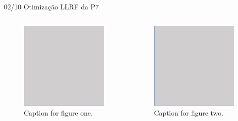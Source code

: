\documentclass{beamer}					%
\begin{document}
\begin{frame}{02/10 Otimização LLRF da P7}

\begin{columns}

\begin{column}{0.5\textwidth}
	\begin{figure}[H]
		\centering
        \includegraphics[width=.9\textwidth]{figures/figure1.png}
        \caption{Caption for figure one.}
        \label{fig:figure1}
	\end{figure}
 \end{column}

 \begin{column}{0.5\textwidth}
	\begin{figure}[H]
		\centering
        \includegraphics[width=.9\textwidth]{figures/figure1.png}
        \caption{Caption for figure two.}
        \label{fig:figure1}
	\end{figure}
 \end{column}
 

\end{columns}
\end{frame}
\end{document}
